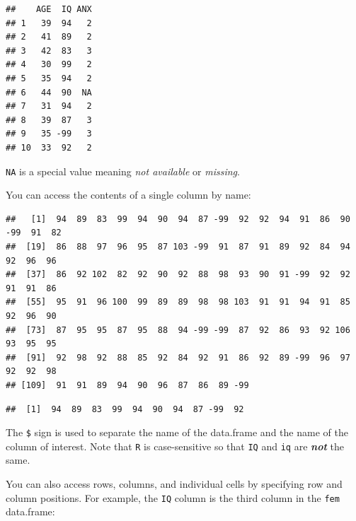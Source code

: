 \documentclass[
  12pt,
]{book}
\newenvironment{Shaded}{\begin{snugshade}}{\end{snugshade}}
\newcommand{\DecValTok}[1]{\textcolor[rgb]{0.00,0.00,0.81}{#1}}
\newcommand{\NormalTok}[1]{#1}
\newcommand{\SpecialCharTok}[1]{\textcolor[rgb]{0.00,0.00,0.00}{#1}}
\begin{document}
\begin{verbatim}
##    AGE  IQ ANX
## 1   39  94   2
## 2   41  89   2
## 3   42  83   3
## 4   30  99   2
## 5   35  94   2
## 6   44  90  NA
## 7   31  94   2
## 8   39  87   3
## 9   35 -99   3
## 10  33  92   2
\end{verbatim}

\texttt{NA} is a special value meaning \emph{not available} or \emph{missing}.

You can access the contents of a single column by name:

\begin{Shaded}
\end{Shaded}

\begin{verbatim}
##   [1]  94  89  83  99  94  90  94  87 -99  92  92  94  91  86  90 -99  91  82
##  [19]  86  88  97  96  95  87 103 -99  91  87  91  89  92  84  94  92  96  96
##  [37]  86  92 102  82  92  90  92  88  98  93  90  91 -99  92  92  91  91  86
##  [55]  95  91  96 100  99  89  89  98  98 103  91  91  94  91  85  92  96  90
##  [73]  87  95  95  87  95  88  94 -99 -99  87  92  86  93  92 106  93  95  95
##  [91]  92  98  92  88  85  92  84  92  91  86  92  89 -99  96  97  92  92  98
## [109]  91  91  89  94  90  96  87  86  89 -99
\end{verbatim}

\begin{Shaded}
\end{Shaded}

\begin{verbatim}
##  [1]  94  89  83  99  94  90  94  87 -99  92
\end{verbatim}

\newpage

The \texttt{\$} sign is used to separate the name of the data.frame and the name of the column of interest. Note that \texttt{R} is case-sensitive so that \texttt{IQ} and \texttt{iq} are \textbf{\emph{not}} the same.

You can also access rows, columns, and individual cells by specifying row and column positions. For example, the \texttt{IQ} column is the third column in the \texttt{fem} data.frame:
\end{document}
